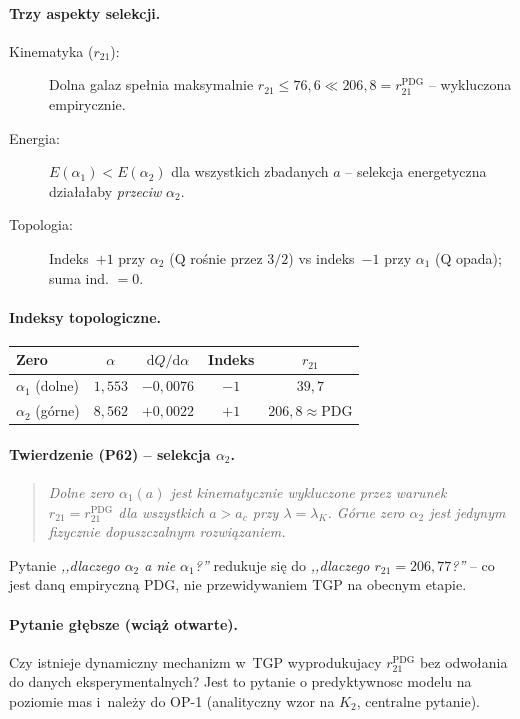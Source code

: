 \paragraph{Trzy aspekty selekcji.}
\begin{description}
  \item[Kinematyka ($r_{21}$):] Dolna galaz spe\l{}nia maksymalnie
        $r_{21}\leq76{,}6\ll206{,}8=r_{21}^{\mathrm{PDG}}$ --
        wykluczona empirycznie.
  \item[Energia:] $E(\alpha_1) < E(\alpha_2)$ dla wszystkich zbadanych $a$ --
        selekcja energetyczna dzia\l{}a\l{}aby \emph{przeciw} $\alpha_2$.
  \item[Topologia:] Indeks~$+1$ przy $\alpha_2$ (Q ro\'snie przez $3/2$)
        vs indeks~$-1$ przy $\alpha_1$ (Q opada); suma ind. $=0$.
\end{description}

\paragraph{Indeksy topologiczne.}
\begin{center}
\begin{tabular}{lcccc}
\hline
Zero & $\alpha$ & $\mathrm{d}Q/\mathrm{d}\alpha$ & Indeks & $r_{21}$ \\
\hline
$\alpha_1$ (dolne) & $1{,}553$ & $-0{,}0076$ & $-1$ & $39{,}7$ \\
$\alpha_2$ (g\'orne) & $8{,}562$ & $+0{,}0022$ & $+1$ & $206{,}8\approx\mathrm{PDG}$ \\
\hline
\end{tabular}
\end{center}

\paragraph{Twierdzenie (P62) -- selekcja $\alpha_2$.}
\begin{quote}
\emph{Dolne zero $\alpha_1(a)$ jest kinematycznie wykluczone przez
warunek $r_{21}=r_{21}^{\mathrm{PDG}}$ dla wszystkich $a>a_c$
przy $\lambda=\lambda_K$.
G\'orne zero $\alpha_2$ jest jedynym fizycznie dopuszczalnym
rozwi\k{a}zaniem.}
\end{quote}
Pytanie \emph{,,dlaczego $\alpha_2$ a nie $\alpha_1$?''} redukuje si\k{e} do
\emph{,,dlaczego $r_{21}=206{,}77$?''} -- co jest danq empiryczn\k{a} PDG,
nie przewidywaniem TGP na obecnym etapie.

\paragraph{Pytanie g\l{}\k{e}bsze (wci\k{a}\.z otwarte).}
Czy istnieje dynamiczny mechanizm w~TGP wyprodukujacy $r_{21}^{\mathrm{PDG}}$
bez odwo\l{}ania do danych eksperymentalnych?
Jest to pytanie o predyktywnosc modelu na poziomie mas
i~nale\.zy do OP-1 (analityczny wzor na $K_2$, centralne pytanie).

